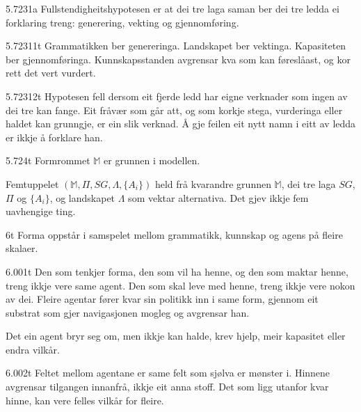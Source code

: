 \begin{formproposition}{5.7231}{a}
Fullstendigheitshypotesen er at dei tre laga saman ber dei tre ledda ei forklaring treng: generering, vekting og gjennomføring.
\end{formproposition}

\begin{formproposition}{5.72311}{t}
Grammatikken ber genereringa. Landskapet ber vektinga. Kapasiteten ber gjennomføringa. Kunnskapsstanden avgrensar kva som kan føreslåast, og kor rett det vert vurdert.
\end{formproposition}

\begin{formproposition}{5.72312}{t}
Hypotesen fell dersom eit fjerde ledd har eigne verknader som ingen av dei tre kan fange. Eit fråvær som går att, og som korkje stega, vurderinga eller haldet kan grunngje, er ein slik verknad. Å gje feilen eit nytt namn i eitt av ledda er ikkje å forklare han.
\end{formproposition}

\begin{formproposition}{5.724}{t}
Formrommet \(\mathbb M\) er grunnen i modellen.

Femtuppelet \((\mathbb M,\Pi,SG,\Lambda,\{A_i\})\) held frå kvarandre grunnen \(\mathbb M\), dei tre laga \(SG\), \(\Pi\) og \(\{A_i\}\), og landskapet \(\Lambda\) som vektar alternativa. Det gjev ikkje fem uavhengige ting.
\end{formproposition}

\begin{formproposition}{6}{t}
Forma oppstår i samspelet mellom grammatikk, kunnskap og agens på fleire skalaer.
\end{formproposition}

\begin{formproposition}{6.001}{t}
Den som tenkjer forma, den som vil ha henne, og den som maktar henne, treng ikkje vere same agent. Den som skal leve med henne, treng ikkje vere nokon av dei. Fleire agentar fører kvar sin politikk inn i same form, gjennom eit substrat som gjer navigasjonen mogleg og avgrensar han.

Det ein agent bryr seg om, men ikkje kan halde, krev hjelp, meir kapasitet eller endra vilkår.
\end{formproposition}

\begin{formproposition}{6.002}{t}
Feltet mellom agentane er same felt som sjølva er mønster i. Hinnene avgrensar tilgangen innanfrå, ikkje eit anna stoff. Det som ligg utanfor kvar hinne, kan vere felles vilkår for fleire.
\end{formproposition}

